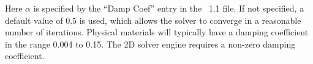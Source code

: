 \begin{itemize}
    Here $\alpha$ is
  specified by the ``Damp Coef'' entry in the \MIF~1.1 file.  If not
  specified, a default value of 0.5 is used, which allows the solver to
  converge in a reasonable number of iterations.  Physical materials
  will typically have a damping coefficient in the range 0.004 to
  0.15.  The 2D solver engine
   requires a
  non-zero damping coefficient.
\end{itemize}


